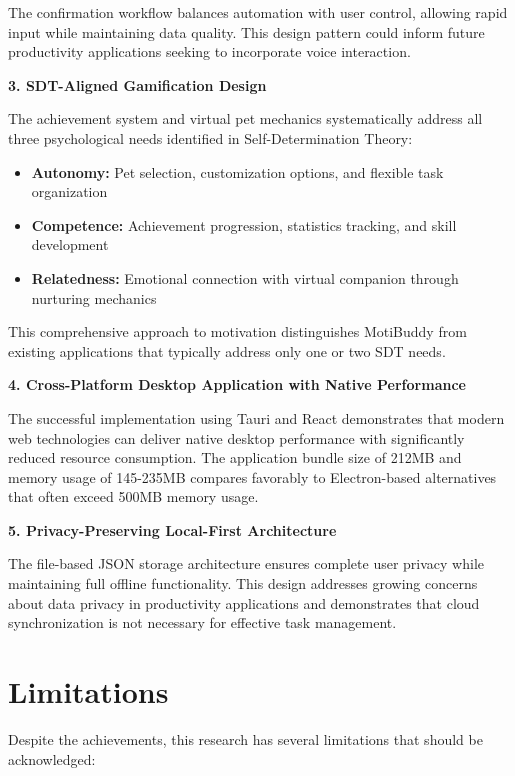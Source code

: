 The confirmation workflow balances automation with user control, allowing rapid input while maintaining data quality. This design pattern could inform future productivity applications seeking to incorporate voice interaction.

\textbf{3. SDT-Aligned Gamification Design}

The achievement system and virtual pet mechanics systematically address all three psychological needs identified in Self-Determination Theory:

\begin{itemize}
    \item \textbf{Autonomy:} Pet selection, customization options, and flexible task organization
    \item \textbf{Competence:} Achievement progression, statistics tracking, and skill development
    \item \textbf{Relatedness:} Emotional connection with virtual companion through nurturing mechanics
\end{itemize}

This comprehensive approach to motivation distinguishes MotiBuddy from existing applications that typically address only one or two SDT needs.

\textbf{4. Cross-Platform Desktop Application with Native Performance}

The successful implementation using Tauri and React demonstrates that modern web technologies can deliver native desktop performance with significantly reduced resource consumption. The application bundle size of 212MB and memory usage of 145-235MB compares favorably to Electron-based alternatives that often exceed 500MB memory usage.

\textbf{5. Privacy-Preserving Local-First Architecture}

The file-based JSON storage architecture ensures complete user privacy while maintaining full offline functionality. This design addresses growing concerns about data privacy in productivity applications and demonstrates that cloud synchronization is not necessary for effective task management.

\section{Limitations}
\label{sec:limitations}

\completed

Despite the achievements, this research has several limitations that should be acknowledged:

